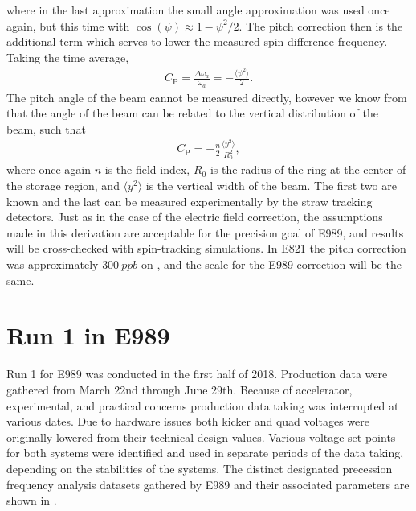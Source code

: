 where in the last approximation the small angle approximation was used once again, but this time with $\cos(\psi) \approx 1 - \psi^{2}/2$. The pitch correction then is the additional term which serves to lower the measured spin difference frequency. Taking the time average,
        \begin{align}
            C_{\text{P}} = \frac{\Delta\omega_{a}}{\omega_{a}} = - \frac{\langle \psi^{2} \rangle}{2}.
        \end{align}
The pitch angle of the beam cannot be measured directly, however we know from  that the angle of the beam can be related to the vertical distribution of the beam, such that 
        \begin{align}
            C_{\text{P}} = - \frac{n}{2} \frac{\langle y^{2} \rangle}{R_{0}^{2}},
        \end{align}
where once again $n$ is the field index, $R_{0}$ is the radius of the ring at the center of the storage region, and $\langle y^{2} \rangle$ is the vertical width of the beam. The first two are known and the last can be measured experimentally by the straw tracking detectors. Just as in the case of the electric field correction, the assumptions made in this derivation are acceptable for the precision goal of E989, and results will be cross-checked with spin-tracking simulations. In E821 the pitch correction was approximately $\SI{300}{ppb}$ on \wa \cite{E821FinalReport}, and the scale for the E989 correction will be the same.




\section{Run 1 in E989}
\label{sec:Run1}


Run 1 for E989 was conducted in the first half of 2018. Production data were gathered from March 22nd through June 29th. Because of accelerator, experimental, and practical concerns production data taking was interrupted at various dates. Due to hardware issues both kicker and quad voltages were originally lowered from their technical design values. Various voltage set points for both systems were identified and used in separate periods of the data taking, depending on the stabilities of the systems. The distinct designated precession frequency analysis datasets gathered by E989 and their associated parameters are shown in . 

